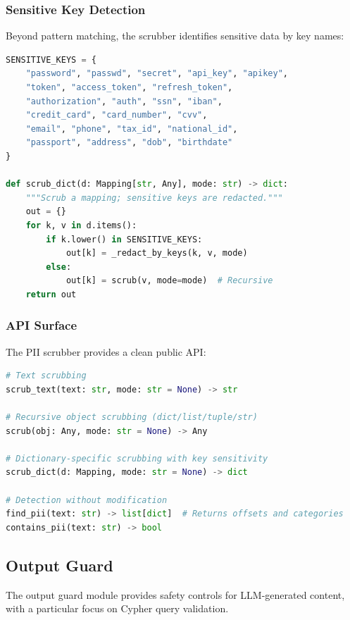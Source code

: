 \subsubsection{Sensitive Key Detection}

Beyond pattern matching, the scrubber identifies sensitive data by key names:

\begin{lstlisting}[language=Python,caption={Sensitive key detection}]
SENSITIVE_KEYS = {
    "password", "passwd", "secret", "api_key", "apikey",
    "token", "access_token", "refresh_token",
    "authorization", "auth", "ssn", "iban",
    "credit_card", "card_number", "cvv",
    "email", "phone", "tax_id", "national_id",
    "passport", "address", "dob", "birthdate"
}

def scrub_dict(d: Mapping[str, Any], mode: str) -> dict:
    """Scrub a mapping; sensitive keys are redacted."""
    out = {}
    for k, v in d.items():
        if k.lower() in SENSITIVE_KEYS:
            out[k] = _redact_by_keys(k, v, mode)
        else:
            out[k] = scrub(v, mode=mode)  # Recursive
    return out
\end{lstlisting}

\subsubsection{API Surface}

The PII scrubber provides a clean public API:

\begin{lstlisting}[language=Python,caption={PII scrubber public API}]
# Text scrubbing
scrub_text(text: str, mode: str = None) -> str

# Recursive object scrubbing (dict/list/tuple/str)
scrub(obj: Any, mode: str = None) -> Any

# Dictionary-specific scrubbing with key sensitivity
scrub_dict(d: Mapping, mode: str = None) -> dict

# Detection without modification
find_pii(text: str) -> list[dict]  # Returns offsets and categories
contains_pii(text: str) -> bool
\end{lstlisting}

\subsection{Output Guard}
\label{subsec:output-guard}

The output guard module provides safety controls for LLM-generated content, with a particular focus on Cypher query validation.

